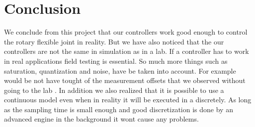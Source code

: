 \documentclass[ twoside,openright,titlepage,numbers=noenddot,headinclude,%
                footinclude=true,cleardoublepage=empty,abstractoff, %
                BCOR=5mm,paper=a4,fontsize=11pt,%
                ngerman,american,%
                ]{scrreprt}
\begin{document}
\chapter{Conclusion}

We conclude from this project that our controllers work good enough to control the rotary flexible joint in reality. But we have also noticed that the our controllers are not the same in simulation as in a lab. If a controller has to work in real applications field testing is essential. So much more things such as saturation, quantization and noise, have be taken into account. For example would be not have tought of the measurement offsets that we observed without going to the lab . In addition we also realized that it is possible to use a continuous model even when in reality it will be executed in a discretely. As long as the sampling time is small enough and good discretization is done by an advanced engine in the background it wont cause any problems.
\end{document}
